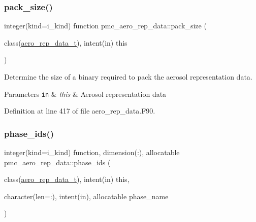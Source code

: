 \mbox{\label{namespacepmc__aero__rep__data_a2f3aef419f1004c1ecebde0a448f415b}} 
\subsubsection{\texorpdfstring{pack\+\_\+size()}{pack\_size()}}
{\footnotesize\ttfamily integer(kind=i\+\_\+kind) function pmc\+\_\+aero\+\_\+rep\+\_\+data\+::pack\+\_\+size (\begin{DoxyParamCaption}\item[{class(\mbox{\hyperlink{structpmc__aero__rep__data_1_1aero__rep__data__t}{aero\+\_\+rep\+\_\+data\+\_\+t}}), intent(in)}]{this }\end{DoxyParamCaption})\hspace{0.3cm}{\ttfamily [private]}}



Determine the size of a binary required to pack the aerosol representation data. 


\begin{DoxyParams}[1]{Parameters}
\mbox{\tt in}  & {\em this} & Aerosol representation data \\
\hline
\end{DoxyParams}


Definition at line 417 of file aero\+\_\+rep\+\_\+data.\+F90.

\mbox{\label{namespacepmc__aero__rep__data_a794f04d2ea273b301cde815c52c73e01}} 
\subsubsection{\texorpdfstring{phase\+\_\+ids()}{phase\_ids()}}
{\footnotesize\ttfamily integer(kind=i\+\_\+kind) function, dimension(\+:), allocatable pmc\+\_\+aero\+\_\+rep\+\_\+data\+::phase\+\_\+ids (\begin{DoxyParamCaption}\item[{class(\mbox{\hyperlink{structpmc__aero__rep__data_1_1aero__rep__data__t}{aero\+\_\+rep\+\_\+data\+\_\+t}}), intent(in)}]{this,  }\item[{character(len=\+:), intent(in), allocatable}]{phase\+\_\+name }\end{DoxyParamCaption})\hspace{0.3cm}{\ttfamily [private]}}



